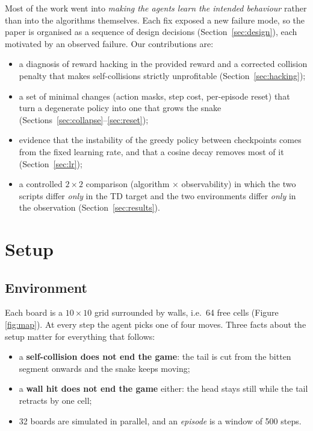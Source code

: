 \documentclass{article}
\begin{document}
Most of the work went into \emph{making the agents learn the intended behaviour} rather than into the algorithms themselves.
Each fix exposed a new failure mode, so the paper is organised as a sequence of design decisions (Section~\ref{sec:design}), each motivated by an observed failure.
Our contributions are:
\begin{itemize}
\item a diagnosis of reward hacking in the provided reward and a corrected collision penalty that makes self-collisions strictly unprofitable (Section~\ref{sec:hacking});
\item a set of minimal changes (action masks, step cost, per-episode reset) that turn a degenerate policy into one that grows the snake (Sections~\ref{sec:collapse}--\ref{sec:reset});
\item evidence that the instability of the greedy policy between checkpoints comes from the fixed learning rate, and that a cosine decay removes most of it (Section~\ref{sec:lr});
\item a controlled $2\times2$ comparison (algorithm $\times$ observability) in which the two scripts differ \emph{only} in the TD target and the two environments differ \emph{only} in the observation (Section~\ref{sec:results}).
\end{itemize}

\section{Setup}
\label{sec:setup}

\subsection{Environment}
Each board is a $10\times10$ grid surrounded by walls, i.e.\ 64 free cells (Figure \ref{fig:map}).
At every step the agent picks one of four moves.
Three facts about the setup matter for everything that follows:
\begin{itemize}
\item a \textbf{self-collision does not end the game}: the tail is cut from the bitten segment onwards and the snake keeps moving;
\item a \textbf{wall hit does not end the game} either: the head stays still while the tail retracts by one cell;
\item 32 boards are simulated in parallel, and an \emph{episode} is a window of 500 steps.
\end{itemize}
\end{document}
